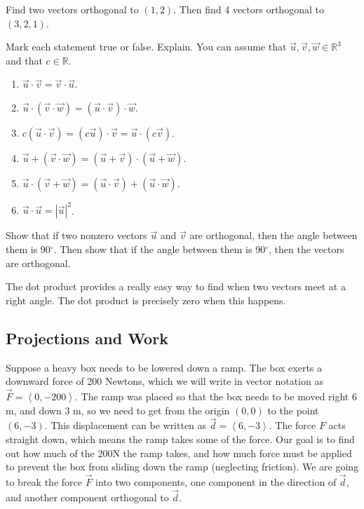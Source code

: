 \begin{problem}
Find two vectors orthogonal to $(1,2)$.  Then find 4 vectors orthogonal to $(3,2,1)$.  
\end{problem}

\begin{problem}
Mark each statement true or false. Explain. You can assume that $\vec u,\vec v,\vec w\in\mathbb{R}^3$ and that $c\in\mathbb{R}$.
\begin{enumerate}
\item $\vec u\cdot \vec v=\vec v\cdot \vec u$. 
\item $\vec u\cdot (\vec v\cdot \vec w)=(\vec u\cdot\vec v)\cdot\vec w$. 
\item $c(\vec u\cdot \vec v)=(c\vec u)\cdot \vec v=\vec u\cdot (c\vec v)$. 
\item $\vec u+(\vec v\cdot \vec w)=(\vec u+\vec v)\cdot(\vec u+\vec w)$. 
\item $\vec u\cdot (\vec v+ \vec w)=(\vec u\cdot \vec v)+(\vec u\cdot\vec w)$. 
\item $\vec u\cdot \vec u= |\vec u|^2$. 
\end{enumerate}
\end{problem}

\begin{problem} 
Show that if two nonzero vectors $\vec u$ and $\vec v$ are orthogonal, then the angle between them is 90$^\circ$. Then show that if the angle between them is 90$^\circ$, then the vectors are orthogonal.
\end{problem}
The dot product provides a really easy way to find when two vectors meet at a right angle. The dot product is precisely zero when this happens.

\subsection{Projections and Work}
Suppose a heavy box needs to be lowered down a ramp.  
The box exerts a downward force of 200 Newtons, which we will write in vector notation as $\vec F=\left<0,-200\right>$. 
The ramp was placed so that the box needs to be moved right 6 m, and down 3 m, so we need to get from the origin $(0,0)$ to the point $(6,-3)$.  This displacement can be written as $\vec d=\left<6,-3\right>$. The force $F$ acts straight down, which means the ramp takes some of the force. Our goal is to find out how much of the 200N the ramp takes, and how much force must be applied to prevent the box from sliding down the ramp (neglecting friction). We are going to break the force $\vec F$ into two components, one component in the direction of $\vec d$, and another component orthogonal to $\vec d$. 

